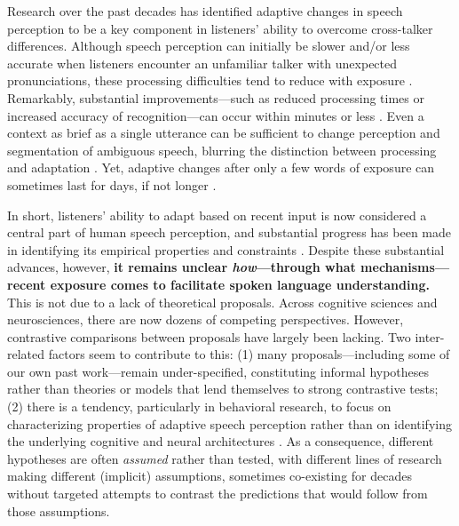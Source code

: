 \documentclass[
  11pt,
  man,floatsintext]{apa6}
\begin{document}
Research over the past decades has identified adaptive changes in speech perception to be a key component in listeners' ability to overcome cross-talker differences. Although speech perception can initially be slower and/or less accurate when listeners encounter an unfamiliar talker with unexpected pronunciations, these processing difficulties tend to reduce with exposure \autocites[e.g.,][]{bradlow-bent2008,nygaard1994,Perrachione2016,sidaras2009,wade2007,weil2001a,xie2021jep}. Remarkably, substantial improvements---such as reduced processing times or increased accuracy of recognition---can occur within minutes or less \autocite{clarke-garrett2004,munro-derwing1995,xie2018jasa}. Even a context as brief as a single utterance can be sufficient to change perception and segmentation of ambiguous speech, blurring the distinction between processing and adaptation \autocites[e.g., categorizing a Dutch ambiguous /m?t/ embedded in an utterance with fast or slow speech as either ``mat'' or ``maat'',][]{bosker2017}[see also][]{kluender1988,newman-sawusch1996,sawusch-newman2000,sjerps2011}. Yet, adaptive changes after only a few words of exposure can sometimes last for days, if not longer \autocites{eisner-mcqueen2006,samuel2021,xie2018lcn}[see also][]{goldinger1996}.

In short, listeners' ability to adapt based on recent input is now considered a central part of human speech perception, and substantial progress has been made in identifying its empirical properties and constraints \autocites[for comprehensive reviews, see][]{baeseberk2020,johnson-sjerps2021,tzeng2021,quam-creel2021,stilp2020}. Despite these substantial advances, however, \textbf{it remains unclear \emph{how}---through what mechanisms---recent exposure comes to facilitate spoken language understanding.} This is not due to a lack of theoretical proposals. Across cognitive sciences and neurosciences, there are now dozens of competing perspectives. However, contrastive comparisons between proposals have largely been lacking. Two inter-related factors seem to contribute to this: (1) many proposals---including some of our own past work---remain under-specified, constituting informal hypotheses rather than theories or models that lend themselves to strong contrastive tests; (2) there is a tendency, particularly in behavioral research, to focus on characterizing properties of adaptive speech perception rather than on identifying the underlying cognitive and neural architectures \autocites[but see][]{apfelbaum-mcmurray2015,chodroff-wilson2020,harmon2019,hoffmanbion-escudero2007,kleinschmidt-jaeger2015,kiefte-nearey2019,lehet-holt2020,mcmurray-jongman2011,xie2021cognition}. As a consequence, different hypotheses are often \emph{assumed} rather than tested, with different lines of research making different (implicit) assumptions, sometimes co-existing for decades without targeted attempts to contrast the predictions that would follow from those assumptions.
\end{document}
